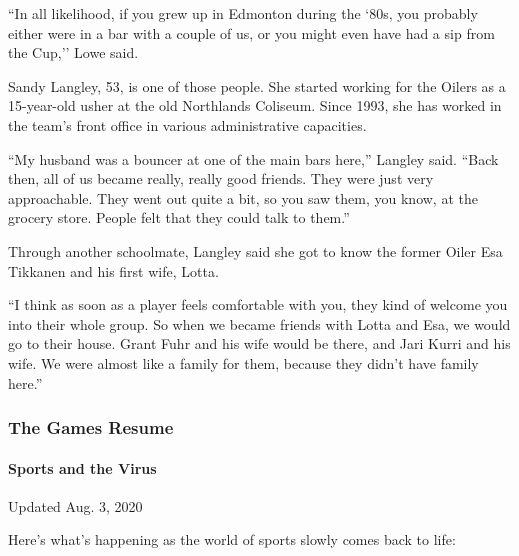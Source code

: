 ``In all likelihood, if you grew up in Edmonton during the `80s, you
probably either were in a bar with a couple of us, or you might even
have had a sip from the Cup,'' Lowe said.

Sandy Langley, 53, is one of those people. She started working for the
Oilers as a 15-year-old usher at the old Northlands Coliseum. Since
1993, she has worked in the team's front office in various
administrative capacities.

``My husband was a bouncer at one of the main bars here,'' Langley said.
``Back then, all of us became really, really good friends. They were
just very approachable. They went out quite a bit, so you saw them, you
know, at the grocery store. People felt that they could talk to them.''

Through another schoolmate, Langley said she got to know the former
Oiler Esa Tikkanen and his first wife, Lotta.

``I think as soon as a player feels comfortable with you, they kind of
welcome you into their whole group. So when we became friends with Lotta
and Esa, we would go to their house. Grant Fuhr and his wife would be
there, and Jari Kurri and his wife. We were almost like a family for
them, because they didn't have family here.''

\hypertarget{the-games-resume}{%
\subsubsection{The Games Resume}\label{the-games-resume}}

\hypertarget{sports-and-the-virus}{%
\paragraph{Sports and the Virus}\label{sports-and-the-virus}}

Updated Aug. 3, 2020

Here's what's happening as the world of sports slowly comes back to
life:

